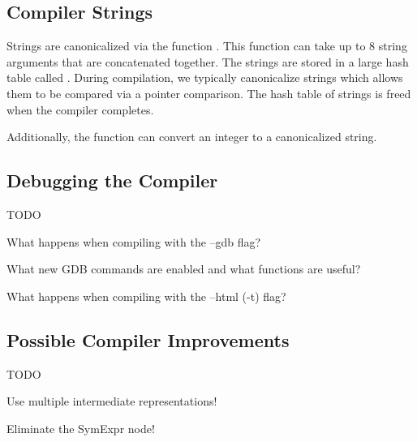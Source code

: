 \documentclass[10pt]{article}
\begin{document}
\subsection{Compiler Strings}
\label{sec:strings}

Strings are canonicalized via the function .  This function
can take up to 8 string arguments that are concatenated together.  The
strings are stored in a large hash table called
.  During compilation, we typically
canonicalize strings which allows them to be compared via a pointer
comparison.  The hash table of strings is freed when the compiler
completes.

Additionally, the function  can convert an integer to a
canonicalized string.

\subsection{Debugging the Compiler}

TODO

What happens when compiling with the --gdb flag?

What new GDB commands are enabled and what functions are useful?

What happens when compiling with the --html (-t) flag?

\subsection{Possible Compiler Improvements}

TODO

Use multiple intermediate representations!

Eliminate the SymExpr node!
\end{document}
